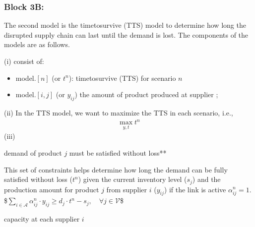 \documentclass[letterpaper,10pt,english]{jupyterBook}
\begin{document}
\subsubsection{Block 3B: }
\label{\detokenize{docs/Case3_1_Disruption_Risk_Analytics:block-3b-tts-model}}
\sphinxAtStartPar
The second model is the time\sphinxhyphen{}to\sphinxhyphen{}survive (TTS) model to determine how long the disrupted supply chain can last until the demand is lost. The components of the models are as follows.

\sphinxAtStartPar
(i)  consist of:
\begin{itemize}
\item {} 
\sphinxAtStartPar
model.\([n]\) (or \(t^{n}\)): time\sphinxhyphen{}to\sphinxhyphen{}survive (TTS) for scenario \(n\)

\item {} 
\sphinxAtStartPar
model.\([i, j]\) (or \(y_{ij}\)) the amount of product  produced at supplier ;

\end{itemize}

\sphinxAtStartPar
(ii)  In the TTS model, we want to maximize the TTS in each scenario, i.e.,
\begin{equation*}
\begin{split}\max_{y,t} t^n\end{split}
\end{equation*}
\sphinxAtStartPar
(iii) 

\sphinxAtStartPar
{}  demand of product \(j\) must be satisfied without loss**

\sphinxAtStartPar
This set of constraints helps determine how long the demand can be fully satisfied without loss (\(t^{n}\)) given the current inventory level (\(s_j\)) and the production amount for product \(j\) from supplier \(i\) (\(y_{ij}\)) if the  link is active \(\alpha^{n}_{ij}=1\).
\$\(\sum_{i\in\mathcal{A}} \alpha^{n}_{ij} \cdot y_{ij} \geq d_j \cdot t^{n} - s_j,\quad \forall j\in \mathcal{V} \)\$

\sphinxAtStartPar
{}  capacity at each supplier \(i\)
\end{document}
